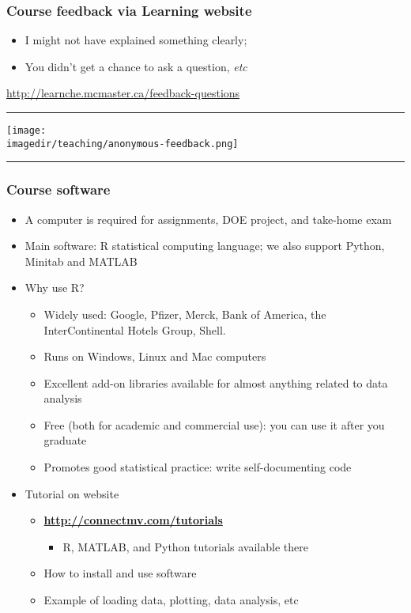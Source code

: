 \begin{frame}\frametitle{Course feedback via Learning website}
	\begin{itemize}
		\item	I might not have explained something clearly;
		\item	You didn't get a chance to ask a question, \emph{etc}
	\end{itemize}
	\href{http://learnche.mcmaster.ca/feedback-questions}{http://learnche.mcmaster.ca/feedback-questions}
	\vspace{12pt}
	\hrule
	\begin{center}
		\texttt{[image: \\imagedir/teaching/anonymous-feedback.png]}
	\end{center}
	\hrule
\end{frame}

\begin{frame}\frametitle{Course software}
	\begin{itemize}
		\item	A computer is required for assignments, DOE project, and take-home exam 
		\item	Main software: R statistical computing language; we also support Python, Minitab and MATLAB 
	\end{itemize}
	\begin{itemize}
		\item	Why use R? 
		\begin{itemize}
			\item	Widely used: Google, Pfizer, Merck, Bank of America, the InterContinental Hotels Group, Shell. 
			\item	Runs on Windows, Linux and Mac computers 
			\item	Excellent add-on libraries available for almost anything related to data analysis 
			\item	Free (both for academic and commercial use): you can use it after you graduate 
			\item	Promotes good statistical practice: write self-documenting code 
		\end{itemize}
	\end{itemize}
	\begin{itemize}
		\item	Tutorial on website 
		\begin{itemize}
			\item	\textbf{\href{http://connectmv.com/tutorials}{http://connectmv.com/tutorials}} 
			\begin{itemize}
				\item	R, MATLAB, and Python tutorials available there 
			\end{itemize}
			\item	How to install and use software 
			\item	Example of loading data, plotting, data analysis, etc 
		\end{itemize}
	\end{itemize}
\end{frame}

